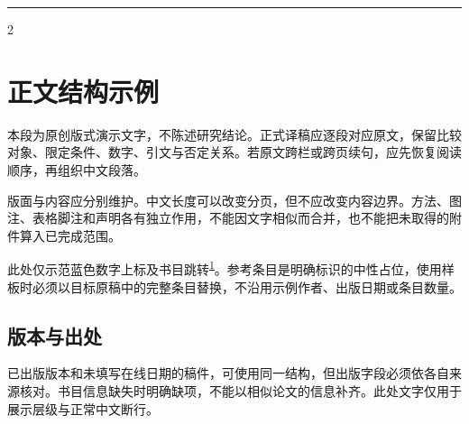 \documentclass[UTF8,fontset=none,scheme=plain]{ctexart}
\renewcommand{\normalsize}{\fontsize{9.05bp}{12.1bp}\selectfont}
\newcommand{\MethodsCite}[1]{\textsuperscript{\hyperlink{ref:#1}{#1}}}
\newenvironment{methodscols}{\begin{multicols}{2}}{\end{multicols}}
\newcommand{\NeutralBody}{%
本段为原创版式演示文字，不陈述研究结论。正式译稿应逐段对应原文，保留比较对象、限定条件、数字、引文与否定关系。若原文跨栏或跨页续句，应先恢复阅读顺序，再组织中文段落。

版面与内容应分别维护。中文长度可以改变分页，但不应改变内容边界。方法、图注、表格脚注和声明各有独立作用，不能因文字相似而合并，也不能把未取得的附件算入已完成范围。

此处仅示范蓝色数字上标及书目跳转\MethodsCite{1}。参考条目是明确标识的中性占位，使用样板时必须以目标原稿中的完整条目替换，不沿用示例作者、出版日期或条目数量。
}
\begin{document}
\par
\vspace{8bp}\hrule\vspace{8bp}\normalfont\normalsize
\begin{methodscols}
\section*{正文结构示例}
\NeutralBody
\subsection*{版本与出处}
已出版版本和未填写在线日期的稿件，可使用同一结构，但出版字段必须依各自来源核对。书目信息缺失时明确缺项，不能以相似论文的信息补齐。此处文字仅用于展示层级与正常中文断行。
\end{methodscols}

\clearpage
\end{document}
